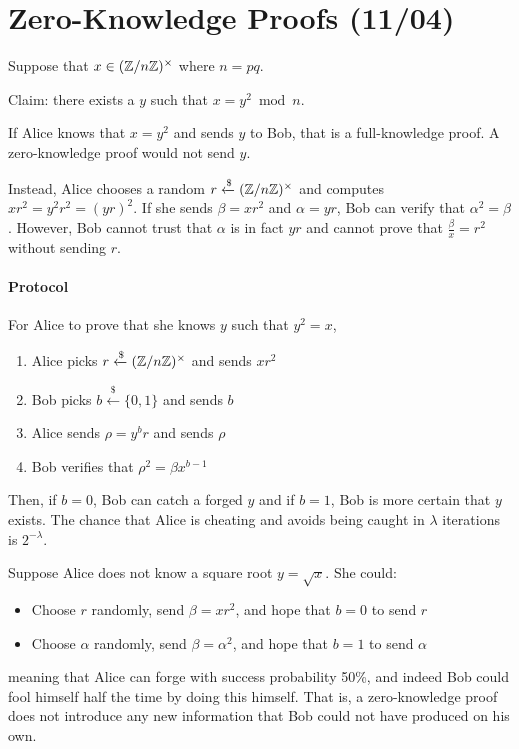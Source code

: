 \documentclass[notes]{agony}
\newcommand{\xgets}{\xleftarrow}
\newcommand{\mgrp}[1]{(\Z/#1\Z)^\times}
\begin{document}
\section{Zero-Knowledge Proofs (11/04)}

Suppose that $x \in \mgrp{n}$ where $n = pq$.

Claim: there exists a $y$ such that $x = y^2 \bmod n$.

If Alice knows that $x = y^2$ and sends $y$ to Bob,
that is a full-knowledge proof.
A zero-knowledge proof would not send $y$.

Instead, Alice chooses a random $r \xgets{\$} \mgrp{n}$
and computes $xr^2 = y^2r^2 = (yr)^2$.
If she sends $\beta = xr^2$ and $\alpha = yr$,
Bob can verify that $\alpha^2 = \beta$.
However, Bob cannot trust that $\alpha$ is in fact $yr$
and cannot prove that $\frac{\beta}{x} = r^2$ without sending $r$.

\paragraph{Protocol} For Alice to prove that she knows $y$ such that $y^2 = x$,
\begin{enumerate}[1.,nosep]
  \item Alice picks $r \xgets{\$} \mgrp{n}$ and sends $xr^2$
  \item Bob picks $b \xgets{\$} \{0,1\}$ and sends $b$
  \item Alice sends $\rho = y^b r$ and sends $\rho$
  \item Bob verifies that $\rho^2 = \beta x^{b-1}$
\end{enumerate}
Then, if $b=0$, Bob can catch a forged $y$ and if $b=1$, Bob is more certain that $y$ exists.
The chance that Alice is cheating and avoids being caught
in $\lambda$ iterations is $2^{-\lambda}$.

Suppose Alice does not know a square root $y = \sqrt{x}$. She could:
\begin{itemize}[nosep]
  \item Choose $r$ randomly, send $\beta = xr^2$, and hope that $b=0$ to send $r$
  \item Choose $\alpha$ randomly, send $\beta = \alpha^2$, and hope that $b=1$ to send $\alpha$
\end{itemize}
meaning that Alice can forge with success probability 50\%,
and indeed Bob could fool himself half the time by doing this himself.
That is, a zero-knowledge proof does not introduce any new information
that Bob could not have produced on his own.
\end{document}
